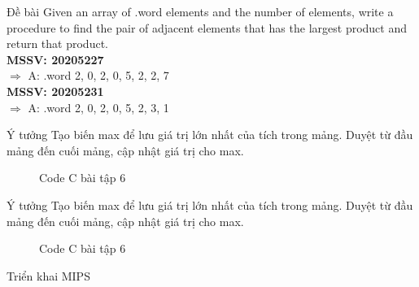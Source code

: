 \documentclass[aspectratio=43,xcolor=dvipsnames]{beamer}
\begin{document}
\begin{frame}{Đề bài}
Given an array of .word elements and the number of elements, write a procedure to find the pair of adjacent elements that has the largest product and return that product. \\
\pause
\textbf{MSSV: 20205227} \\
$\Rightarrow$ A: .word 2, 0, 2, 0, 5, 2, 2, 7 \\
\textbf{MSSV: 20205231} \\
$\Rightarrow$ A: .word 2, 0, 2, 0, 5, 2, 3, 1
\end{frame}
\begin{frame}{Ý tưởng}
    Tạo biến max để lưu giá trị lớn nhất của tích trong mảng. Duyệt từ đầu mảng đến cuối mảng, cập nhật giá trị cho max. \\
    \pause
\begin{figure}[!h]
	\centerline{}
	\caption{Code C bài tập 6}
	\label{fig:bai6}
\end{figure}
\end{frame}
\begin{frame}{Ý tưởng}
    Tạo biến max để lưu giá trị lớn nhất của tích trong mảng. Duyệt từ đầu mảng đến cuối mảng, cập nhật giá trị cho max. \\
\begin{figure}[!h]
	\centerline{}
	\caption{Code C bài tập 6}
	\label{fig:bai6}
\end{figure}
\end{frame}
\begin{frame}{Triển khai MIPS}
    
\end{frame}
\end{document}
